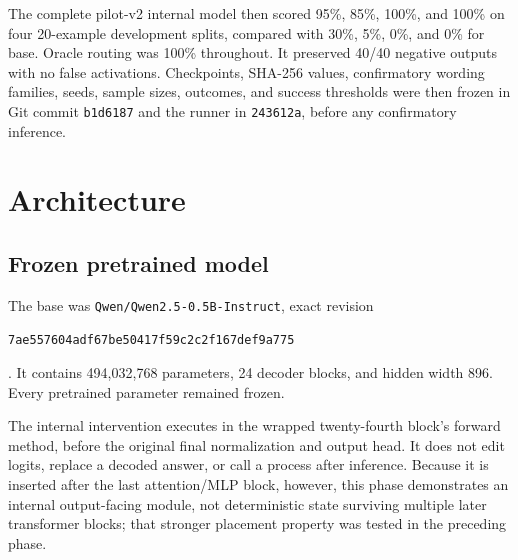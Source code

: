\documentclass[11pt]{article}
\newcommand{\code}[1]{\texttt{#1}}
\begin{document}
The complete pilot-v2 internal model then scored 95\%, 85\%, 100\%, and 100\%
on four 20-example development splits, compared with 30\%, 5\%, 0\%, and 0\%
for base. Oracle routing was 100\% throughout. It preserved 40/40 negative
outputs with no false activations. Checkpoints, SHA-256 values, confirmatory
wording families, seeds, sample sizes, outcomes, and success thresholds were
then frozen in Git commit
\code{b1d6187} and the runner in \code{243612a}, before any confirmatory
inference.

\section{Architecture}

\subsection{Frozen pretrained model}

The base was \code{Qwen/Qwen2.5-0.5B-Instruct}, exact revision
\begin{sloppypar}
\code{7ae557604adf67be50417f59c2c2f167def9a775}
\end{sloppypar}
\cite{qwen2024}. It contains 494,032,768 parameters, 24 decoder blocks, and
hidden width 896. Every pretrained parameter remained frozen.

\begin{center}
\end{center}

The internal intervention executes in the wrapped twenty-fourth block's
forward method, before the original final normalization and output head. It
does not edit logits, replace a decoded answer, or call a process after
inference. Because it is inserted after the last attention/MLP block, however,
this phase demonstrates an internal output-facing module, not deterministic
state surviving multiple later transformer blocks; that stronger placement
property was tested in the preceding phase.
\end{document}
